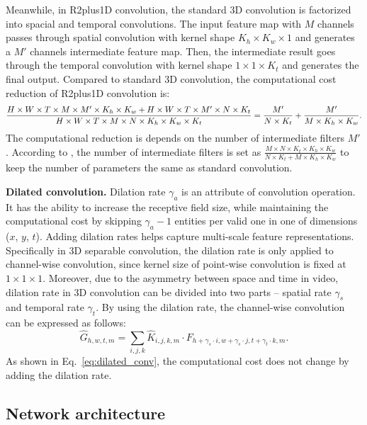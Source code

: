 \documentclass{bmvc2k}
\begin{document}
Meanwhile, in R2plus1D convolution, the standard 3D convolution is factorized into spacial and temporal convolutions. The input feature map with $M$ channels passes through spatial convolution with kernel shape $K_h\times K_w \times 1$ and generates a $M'$ channels intermediate feature map. Then, the intermediate result goes through the temporal convolution with kernel shape $1\times 1\times K_t$ and generates the final output. Compared to standard 3D convolution, the computational cost reduction of R2plus1D convolution is:
\begin{equation}
\label{eqa:r2p1d}
\small
\frac{H\times W \times T\times M\times M'\times K_h\times K_w + H\times W \times T\times M'\times N\times K_t}{H\times W\times T\times M\times N\times K_h\times K_w\times K_t} = \frac{M'}{N\times K_t} + \frac{M'}{M\times K_h\times K_w}.
\end{equation}
The computational reduction is depends on the number of intermediate filters $M'$. According to \cite{r2plus1d_cvpr18}, the number of intermediate filters is set as $\frac{M\times N \times K_t\times K_h\times K_w}{N\times K_t + M\times K_h\times K_w}$ to keep the number of parameters the same as standard convolution.

\textbf{Dilated convolution.} Dilation rate $\gamma_a$ is an attribute of convolution operation. It has the ability to increase the receptive field size, while maintaining the computational cost by skipping $\gamma_a - 1$ entities per valid one in one of dimensions ($x$, $y$, $t$). Adding dilation rates helps capture multi-scale feature representations. Specifically in 3D separable convolution, the dilation rate is only applied to channel-wise convolution, since kernel size of point-wise convolution is fixed at $1\times1\times1$. Moreover, due to the asymmetry between space and time in video, dilation rate in 3D convolution can be divided into two parts -- spatial rate $\gamma_s$ and temporal rate $\gamma_t$. By using the dilation rate, the channel-wise convolution can be expressed as follows:
\begin{equation}
\label{eq:dilated_conv}
\hat{G}_{h,w,t,m} = \sum_{i,j,k} \hat{K}_{i,j,k,m}\cdot F_{h+\gamma_s\cdot i,w+\gamma_s\cdot j,t+\gamma_t\cdot k,m}.
\end{equation}
As shown in Eq.~\ref{eq:dilated_conv}, the computational cost does not change by adding the dilation rate. 



\subsection{Network architecture}
\label{sec:network}
\end{document}
